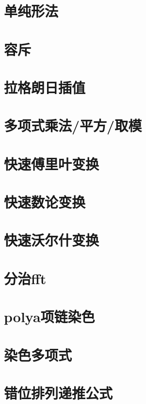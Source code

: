 \section{单纯形法}
\raggedbottom
\hrulefill
\section{容斥}
\raggedbottom
\hrulefill
\section{拉格朗日插值}
\raggedbottom
\hrulefill
\section{多项式乘法/平方/取模}
\raggedbottom
\hrulefill
\section{快速傅里叶变换}
\raggedbottom
\hrulefill
\section{快速数论变换}
\raggedbottom
\hrulefill
\section{快速沃尔什变换}
\raggedbottom
\hrulefill
\section{分治fft}
\raggedbottom
\hrulefill
\section{polya项链染色}
\raggedbottom
\hrulefill
\section{染色多项式}
\raggedbottom
\hrulefill
\section{	错位排列递推公式}
\raggedbottom
\hrulefill
